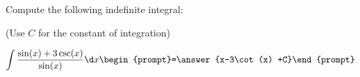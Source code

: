 \documentclass{ximera}
\author{Jim Talamo}
\begin{document}
\begin{exercise}
Compute the following indefinite integral:

\begin{prompt} (Use $C$ for the constant of integration) \end{prompt}

\[
\int \frac{\sin(x)+3\csc(x)}{\sin(x)}  \d x 
\begin{prompt}=\answer{x-3\cot(x) +C}\end{prompt}
\]
\end{exercise}
\end{document}
